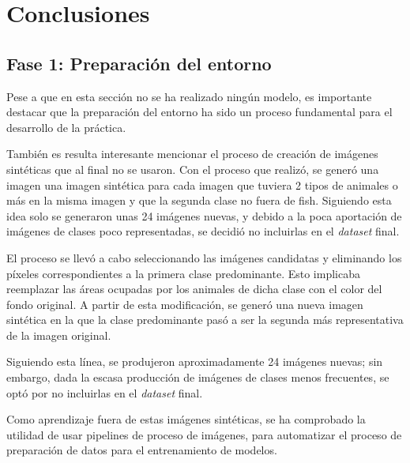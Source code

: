 \section{Conclusiones}

\noindent


\subsection{Fase 1: Preparación del entorno}

\quad

\noindent
Pese a que en esta sección no se ha realizado ningún modelo, 
es importante destacar que la preparación del entorno ha sido un 
proceso fundamental para el desarrollo de la práctica.

\quad

\noindent
También es resulta interesante mencionar el proceso de creación de imágenes sintéticas que al final no se 
usaron. Con el proceso que realizó, se generó una imagen una imagen sintética para cada
imagen que tuviera 2 tipos de animales o más en la misma imagen y que la segunda clase no fuera de fish.
Siguiendo esta idea solo se generaron unas 24 imágenes nuevas, y debido a la poca aportación de imágenes de clases poco 
representadas, se decidió no incluirlas en el \textit{dataset} final. 

\quad

\noindent
El proceso se llevó a cabo seleccionando las imágenes candidatas y eliminando los 
píxeles correspondientes a la primera clase predominante. Esto implicaba reemplazar 
las áreas ocupadas por los animales de dicha clase con el color del fondo original. 
A partir de esta modificación, se generó una nueva imagen sintética en la que la clase 
predominante pasó a ser la segunda más representativa de la imagen original.

\quad

\noindent
Siguiendo esta línea, 
se produjeron aproximadamente 24 imágenes nuevas; sin embargo, dada la escasa producción 
de imágenes de clases menos frecuentes, se optó por no incluirlas en el \textit{dataset} final.

\quad

\noindent
Como aprendizaje fuera de estas imágenes sintéticas, se ha comprobado la utilidad de usar pipelines de
proceso de imágenes, para automatizar el proceso de preparación de datos para el entrenamiento de modelos.

